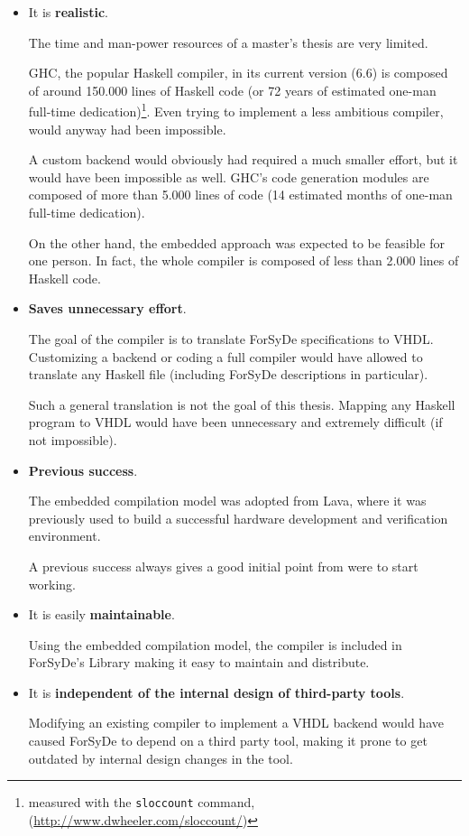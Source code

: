 \begin{itemize}
\item It is \textbf{realistic}. 
  
  The time and man-power resources of a master's thesis are very limited.

  GHC, the popular Haskell compiler, in its current version (6.6) is
  composed of around 150.000 lines of Haskell code (or 72 years of
  estimated one-man full-time dedication)\footnote{measured
    with the \texttt{sloccount} command,
    (\url{http://www.dwheeler.com/sloccount/})}. Even trying to
  implement a less ambitious compiler, would anyway had been
  impossible.

  A custom backend would obviously had required a much smaller effort,
  but it would have been impossible as well. GHC's code generation
  modules are composed of more than 5.000 lines of code (14 estimated
  months of one-man full-time dedication).
  
  On the other hand, the embedded approach was expected to be feasible
  for one person. In fact, the whole compiler is composed of less than
  2.000 lines of Haskell code.
  
\item \textbf{Saves unnecessary effort}.

  The goal of the compiler is to translate ForSyDe specifications to
  VHDL. Customizing a backend or coding a full compiler would have
  allowed to translate any Haskell file (including ForSyDe descriptions
  in particular).

  Such a general translation is not the goal of this thesis.
  Mapping any Haskell program to VHDL would have been unnecessary and
  extremely difficult (if not impossible).

\item \textbf{Previous success}.

  The embedded compilation model was adopted from Lava, where it was
  previously used to build a successful hardware development and
  verification environment.

  A previous success always gives a good initial point from were to
  start working.

\item It is easily \textbf{maintainable}.
  
  Using the embedded compilation model, the compiler is included in
  ForSyDe's Library making it easy to maintain and distribute.
  
\item It is \textbf{independent of the internal design of third-party
    tools}.

  Modifying an existing compiler to implement a VHDL backend would
  have caused ForSyDe to depend on a third party tool, making it prone
  to get outdated by internal design changes in the tool.
  
\end{itemize}

